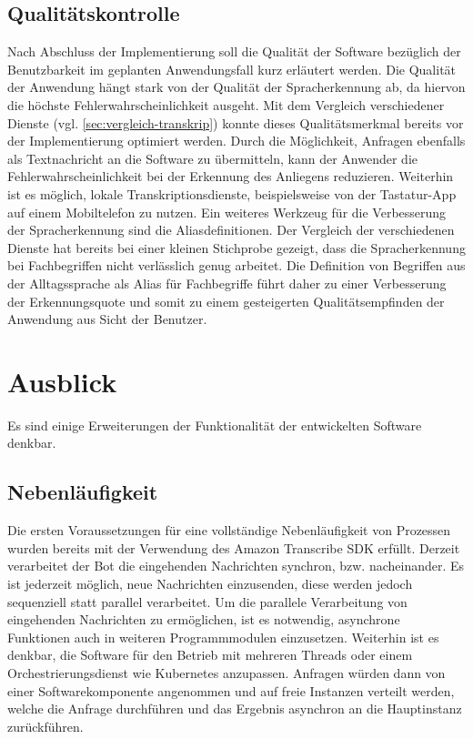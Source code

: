 \subsection{Qualitätskontrolle}

Nach Abschluss der Implementierung soll die Qualität der Software bezüglich der Benutzbarkeit im geplanten Anwendungsfall kurz erläutert werden. Die Qualität der Anwendung hängt stark von der Qualität der Spracherkennung ab, da hiervon die höchste Fehlerwahrscheinlichkeit ausgeht. Mit dem Vergleich verschiedener Dienste (vgl. \autoref{sec:vergleich-transkrip}) konnte dieses Qualitätsmerkmal bereits vor der Implementierung optimiert werden. Durch die Möglichkeit, Anfragen ebenfalls als Textnachricht an die Software zu übermitteln, kann der Anwender die Fehlerwahrscheinlichkeit bei der Erkennung des Anliegens reduzieren. Weiterhin ist es möglich, lokale Transkriptionsdienste, beispielsweise von der Tastatur-App auf einem Mobiltelefon zu nutzen. Ein weiteres Werkzeug für die Verbesserung der Spracherkennung sind die Aliasdefinitionen. Der Vergleich der verschiedenen Dienste hat bereits bei einer kleinen Stichprobe gezeigt, dass die Spracherkennung bei Fachbegriffen nicht verlässlich genug arbeitet. Die Definition von Begriffen aus der Alltagssprache als Alias für Fachbegriffe führt daher zu einer Verbesserung der Erkennungsquote und somit zu einem gesteigerten Qualitätsempfinden der Anwendung aus Sicht der Benutzer.

\section{Ausblick}

Es sind einige Erweiterungen der Funktionalität der entwickelten Software denkbar. 

\subsection{Nebenläufigkeit}

Die ersten Voraussetzungen für eine vollständige Nebenläufigkeit von Prozessen wurden bereits mit der Verwendung des Amazon Transcribe SDK erfüllt. Derzeit verarbeitet der Bot die eingehenden Nachrichten synchron, bzw. nacheinander. Es ist jederzeit möglich, neue Nachrichten einzusenden, diese werden jedoch sequenziell statt parallel verarbeitet. Um die parallele Verarbeitung von eingehenden Nachrichten zu ermöglichen, ist es notwendig, asynchrone Funktionen auch in weiteren Programmmodulen einzusetzen. Weiterhin ist es denkbar, die Software für den Betrieb mit mehreren Threads oder einem Orchestrierungsdienst wie Kubernetes anzupassen. Anfragen würden dann von einer Softwarekomponente angenommen und auf freie Instanzen verteilt werden, welche die Anfrage durchführen und das Ergebnis asynchron an die Hauptinstanz zurückführen. 

